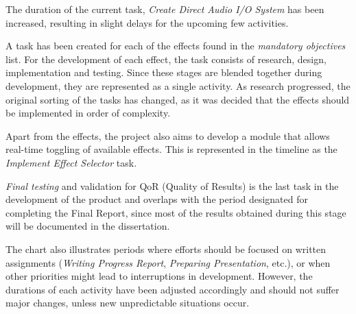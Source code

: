 The duration of the current task, \textit{Create Direct Audio I/O System} has been increased, resulting in slight delays for the upcoming few activities.

A task has been created for each of the effects found in the \textit{mandatory objectives} list. For the development of each effect, the task consists of research, design, implementation and testing. Since these stages are blended together during development, they are represented as a single activity. As research progressed, the original sorting of the tasks has changed, as it was decided that the effects should be implemented in order of complexity.

Apart from the effects, the project also aims to develop a module that allows real-time toggling of available effects. This is represented in the timeline as the \textit{Implement Effect Selector} task.

\textit{Final testing} and validation for QoR (Quality of Results) is the last task in the development of the product and overlaps with the period designated for completing the Final Report, since most of the results obtained during this stage will be documented in the dissertation.

The chart also illustrates periods where efforts should be focused on written assignments (\textit{Writing Progress Report}, \textit{Preparing Presentation}, etc.), or when other priorities might lead to interruptions in development. However, the durations of each activity have been adjusted accordingly and should not suffer major changes, unless new unpredictable situations occur.